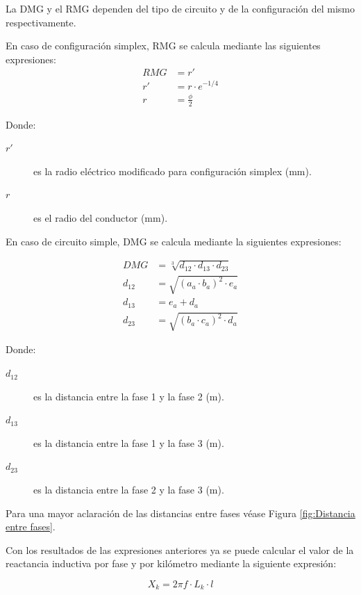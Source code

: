 La \ac{DMG} y el \ac{RMG} dependen del tipo de circuito y de la configuración del mismo respectivamente.

En caso de configuración simplex, \ac{RMG} se calcula mediante las siguientes expresiones:
\begin{align}
RMG &= r'
\label{eq:cdt-RMG} \\[0.5em]
r' &= r \cdot e^{-1/4}
\label{eq:cdt-RMG-r'} \\[0.5em]
r &= \frac{\phi}{2}
\label{eq:cdt-RMG-r}
\end{align}

Donde:
\begin{description}
  \item[$r'$] es la radio eléctrico modificado para configuración simplex (\si{\milli\meter}).
  \item[$r$] es el radio del conductor (\si{\milli\meter}).
\end{description}

En caso de circuito simple, \ac{DMG} se calcula mediante la siguientes expresiones:

\begin{align}
DMG &= \sqrt[3]{d_{12} \cdot d_{13} \cdot d_{23}} 
\label{eq:cdt-RMG} \\[0.5em]
d_{12} &= \sqrt{(a_a \cdot b_a)^2 \cdot e_a}
\label{eq:cdt-DMG-d12} \\[0.5em]
d_{13} &= e_a + d_a
\label{eq:cdt-DMG-d13} \\[0.5em]
d_{23} &= \sqrt{(b_a \cdot c_a)^2 \cdot d_a}
\label{eq:cdt-DMG-d23}
\end{align}

Donde:
\begin{description}
  \item[$d_{12}$] es la distancia entre la fase 1 y la fase 2 (\si{\meter}).
  \item[$d_{13}$] es la distancia entre la fase 1 y la fase 3 (\si{\meter}).
  \item[$d_{23}$] es la distancia entre la fase 2 y la fase 3 (\si{\meter}).
\end{description}
Para una mayor aclaración de las distancias entre fases véase Figura \ref{fig:Distancia entre fases}.


Con los resultados de las expresiones anteriores ya se puede calcular el valor de la reactancia inductiva por fase y por kilómetro mediante la siguiente expresión:

\begin{equation}
\label{eq:cdt-reactancia}
X_k = 2\pi f \cdot L_k \cdot l
\end{equation}

